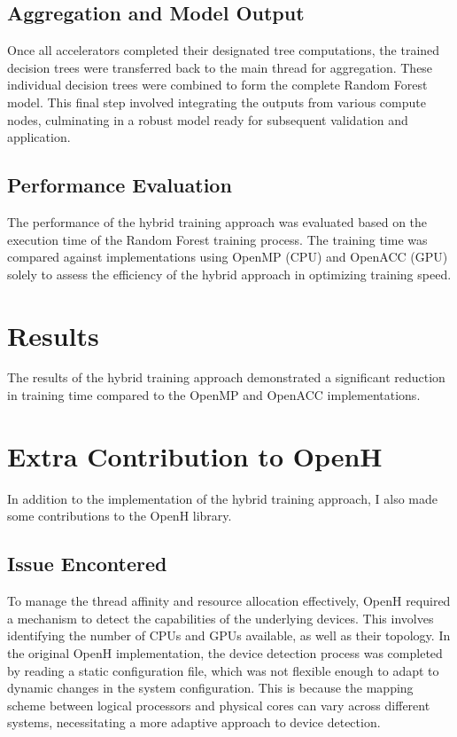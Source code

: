 \documentclass[11.5pt]{article}
\begin{document}
\subsection{Aggregation and Model Output}
Once all accelerators completed their designated tree computations, the trained decision trees were transferred back to the main thread for aggregation.
These individual decision trees were combined to form the complete Random Forest model. This final step involved integrating the outputs from various compute nodes, culminating in a robust model ready for subsequent validation and application.

\subsection{Performance Evaluation}
The performance of the hybrid training approach was evaluated based on the execution time of the Random Forest training process.
The training time was compared against implementations using OpenMP (CPU) and OpenACC (GPU) solely to assess the efficiency of the hybrid approach in optimizing training speed.

\section{Results}
The results of the hybrid training approach demonstrated a significant reduction in training time compared to the OpenMP and OpenACC implementations. 



\section{Extra Contribution to OpenH}
In addition to the implementation of the hybrid training approach, 
I also made some contributions to the OpenH library.

\subsection{Issue Encontered}
To manage the thread affinity and resource allocation effectively, OpenH required a mechanism to detect the capabilities of the underlying devices. This involves identifying the number of CPUs and GPUs available, 
as well as their topology. In the original OpenH implementation, the device detection process was completed by reading a static configuration file, which was not flexible enough to adapt to dynamic changes in the system configuration.
This is because the mapping scheme between logical processors and physical cores can vary across different systems, necessitating a more adaptive approach to device detection.
\end{document}
